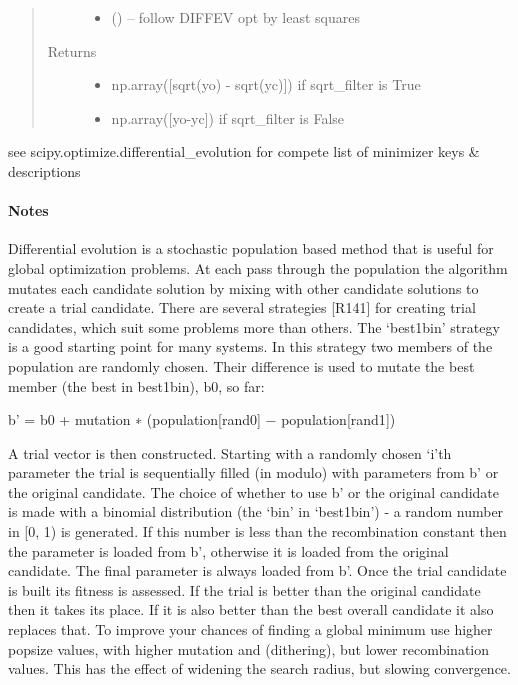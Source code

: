\documentclass[letterpaper,10pt,english]{sphinxmanual}
\begin{document}
\begin{fulllineitems}
\begin{fulllineitems}
\begin{quote}
\begin{description}
\begin{itemize}
\item {} 
 () -- follow DIFFEV opt by least squares

\end{itemize}

\item[{Returns}] \leavevmode
\begin{itemize}
\item {} 
np.array({[}sqrt(yo) - sqrt(yc){]}) if sqrt\_filter is True

\item {} 
np.array({[}yo-yc{]}) if sqrt\_filter is False

\end{itemize}


\end{description}\end{quote}

see scipy.optimize.differential\_evolution for compete list of minimizer keys \& descriptions
\paragraph{Notes}

Differential evolution is a stochastic population based method that is useful for global optimization
problems. At each pass through the population the algorithm mutates each candidate solution by mixing
with other candidate solutions to create a trial candidate. There are several strategies {[}R141{]} for
creating trial candidates, which suit some problems more than others. The ‘best1bin’ strategy is a good
starting point for many systems. In this strategy two members of the population are randomly chosen.
Their difference is used to mutate the best member (the best in best1bin), b0, so far:

b’ = b0 + mutation ∗ (population{[}rand0{]} − population{[}rand1{]})

A trial vector is then constructed. Starting with a randomly chosen ‘i’th parameter the trial is
sequentially filled (in modulo) with parameters from b’ or the original candidate. The choice of
whether to use b’ or the original candidate is made with a binomial distribution
(the ‘bin’ in ‘best1bin’) - a random number in {[}0, 1) is generated. If this number is less than
the recombination constant then the parameter is loaded from b’, otherwise it is loaded from the
original candidate. The final parameter is always loaded from b’. Once the trial candidate is built
its fitness is assessed. If the trial is better than the original candidate then it takes its place.
If it is also better than the best overall candidate it also replaces that. To improve your chances of
finding a global minimum use higher popsize values, with higher mutation and (dithering), but lower
recombination values. This has the effect of widening the search radius, but slowing convergence.


\end{fulllineitems}
\end{fulllineitems}
\end{document}
